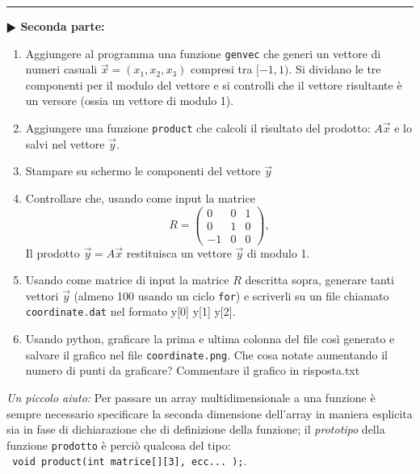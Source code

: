 \documentclass[11pt]{article}
\begin{document}
\hrule
\vspace{2mm}
\textbf{$\RHD$ Seconda parte:}
\vspace{2mm}
\begin{enumerate}
\item
Aggiungere al programma una funzione \texttt{genvec} che generi un vettore di numeri casuali $\vec{x}=\left(x_1,x_2,x_3\right)$ 
compresi tra $[-1,1)$. Si dividano le tre componenti per il modulo del vettore e si controlli che il 
vettore risultante \`e un versore (ossia un vettore di modulo 1).
\item Aggiungere una funzione \texttt{product} che calcoli il risultato del prodotto: 
$A \vec{x}$ e lo salvi nel vettore $\vec{y}$.
\item Stampare su schermo le componenti del vettore $\vec{y}$
\item Controllare che, usando come input la matrice
\[
R = \left(\begin{array}{ccc}
 0 & 0 & 1\\
 0 & 1 & 0\\
-1 & 0 & 0
\end{array}
\right),
\]
Il prodotto $\vec{y}=A \vec{x}$ restituisca un vettore $\vec{y}$ di modulo 1.
\item Usando come matrice di input la matrice $R$ descritta sopra, generare tanti vettori $\vec{y}$ (almeno 100 usando un ciclo \texttt{for}) e scriverli su un file chiamato
\texttt{coordinate.dat} nel formato
y[0] y[1] y[2].\\
\item Usando python, graficare la prima e ultima colonna del file cos\`i generato e salvare il grafico nel file \texttt{coordinate.png}. Che cosa notate aumentando il numero di punti da graficare? Commentare il grafico in risposta.txt
\end{enumerate}

\begin{mdframed}[backgroundcolor=gray!10]
{\em Un piccolo aiuto:} Per passare un array multidimensionale a una funzione \`{e} sempre necessario specificare la seconda  dimensione dell'array in maniera esplicita sia in fase di dichiarazione che di definizione della funzione;
il {\em prototipo} della funzione \texttt{prodotto} \`{e} perci\`{o} qualcosa del tipo:
\\
\texttt{
void product(int matrice[][3], ecc... );}.

\end{mdframed}
\end{document}
